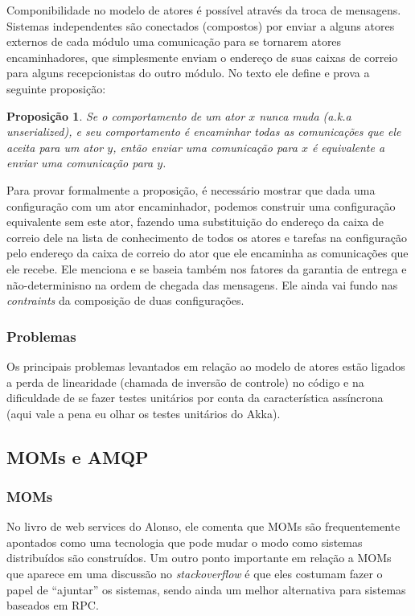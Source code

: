 \documentclass[]{article}
\newtheorem{prop}{Proposição}[section]
\begin{document}
		\par Componibilidade no modelo de atores é possível através da troca de mensagens. Sistemas independentes são
		conectados (compostos) por enviar a alguns atores externos de cada módulo uma comunicação para se tornarem
		atores encaminhadores, que simplesmente enviam o endereço de suas caixas de correio para alguns recepcionistas 
		do outro módulo. No texto ele define e prova a seguinte proposição:
		
		\begin{prop}
			Se o comportamento de um ator $x$ nunca muda (a.k.a unserialized), e seu comportamento é encaminhar
			todas as comunicações que ele aceita para um ator $y$, então enviar uma comunicação para $x$ é 
			equivalente a enviar uma comunicação para $y$.
		\end{prop}
		\par Para provar formalmente a proposição, é necessário mostrar que dada uma configuração com um ator 
		encaminhador, podemos construir uma configuração equivalente sem este ator, fazendo uma substituição
		do endereço da caixa de correio dele na lista de conhecimento de todos os atores e tarefas na configuração
		pelo endereço da caixa de correio do ator que ele encaminha as comunicações que ele recebe. Ele menciona
		e se baseia também nos fatores da garantia de entrega e não-determinisno na ordem de chegada das mensagens.
		Ele ainda vai fundo nas \textit{contraints} da composição de duas configurações.
		
		\subsubsection{Problemas}
		\par Os principais problemas levantados em relação ao modelo de atores estão ligados a perda de linearidade
		(chamada de inversão de controle) no código e na dificuldade de se fazer testes unitários por conta da
		característica assíncrona (aqui vale a pena eu olhar os testes unitários do Akka).
	\subsection{MOMs e AMQP}
		\subsubsection{MOMs}
			No livro de web services do Alonso, ele comenta que MOMs são frequentemente apontados como uma tecnologia
			que pode mudar o modo como sistemas  distribuídos são construídos. Um outro ponto importante em relação a MOMs
			que aparece em uma discussão no \textit{stackoverflow} é que eles costumam fazer o papel de ``ajuntar'' os
			sistemas, sendo ainda um melhor alternativa para sistemas baseados em RPC.
\end{document}
